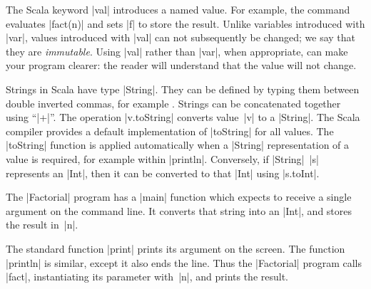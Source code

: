 The Scala keyword |val| introduces a named value.  For
example, the command
evaluates |fact(n)| and sets |f| to store the result.
%
Unlike variables introduced with |var|, values introduced with |val| can not
subsequently be changed; we say that they are \emph{immutable}.  Using |val|
rather than |var|, when appropriate, can make your program clearer: the reader
will understand that the value will not change.


Strings in Scala have type |String|.  They can be defined
by typing them between double inverted commas, for example
.
%
Strings can be concatenated together using ``|+|''. 
%
The operation |v.toString| converts value~|v| to a
|String|.  The Scala compiler provides a default implementation of |toString|
for all values.  The |toString| function is applied automatically when a
|String| representation of a value is required, for example within |println|.
%
Conversely, if |String|~|s| represents an |Int|, then it can be converted to
that |Int| using |s.toInt|.

The |Factorial| program has a |main| function which expects to receive a
single argument on the command line.  It converts that string into an |Int|,
and stores the result in~|n|.


The standard function |print| prints its argument
on the screen.  The function |println| is
similar, except it also ends the line.  Thus the |Factorial| program calls
|fact|, instantiating its parameter with~|n|, and prints the result.

